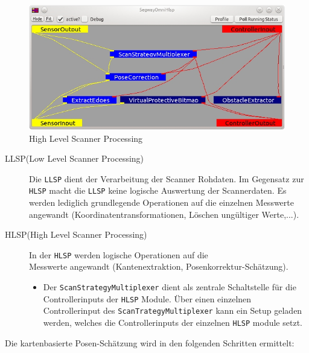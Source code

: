 \begin{figure}[h]
\center
\includegraphics[scale=0.7]{graphics/Hlsp.jpg}
\caption{\label{fig:Hlsp} High Level Scanner Processing}
\end{figure}
 
\begin{description}
\item[LLSP(Low Level Scanner Processing)] Die \lstinline{LLSP} dient der
Verarbeitung der Scanner Rohdaten. Im Gegensatz zur \lstinline{HLSP} macht die
\lstinline{LLSP} keine logische Auswertung der Scannerdaten.
 Es werden lediglich grundlegende Operationen auf die einzelnen Messwerte angewandt
 (Koordinatentransformationen, Löschen ungültiger Werte,...).
\item[HLSP(High Level Scanner Processing)] In der \lstinline{HLSP} werden
logische Operationen auf die\\ Messwerte angewandt (Kantenextraktion,
Posenkorrektur-Schätzung).
\begin{itemize}
  \item Der \lstinline{ScanStrategyMultiplexer} dient als zentrale Schaltstelle
  für die Controllerinputs der \lstinline{HLSP} Module.
  Über einen einzelnen Controllerinput des \lstinline{ScanTrategyMultiplexer}
  kann ein Setup geladen werden, welches die Controllerinputs der einzelnen
 \lstinline{HLSP} module setzt.
\end{itemize}
\end{description}

Die kartenbasierte Posen-Schätzung wird in den folgenden Schritten ermittelt:

